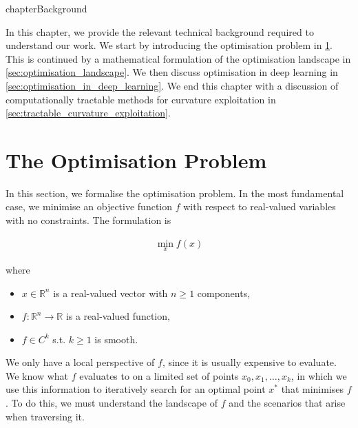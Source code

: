 chapter{Background}

\label{chap:background}



In this chapter, we provide the relevant technical background required to understand our work. We start by introducing the optimisation problem in \cref{sec:optimisation_problem}. This is continued by a mathematical formulation of the optimisation landscape in \cref{sec:optimisation_landscape}. We then discuss optimisation in deep learning in \cref{sec:optimisation_in_deep_learning}. We end this chapter with a discussion of computationally tractable methods for curvature exploitation in \cref{sec:tractable_curvature_exploitation}.



\section{The Optimisation Problem}

\label{sec:optimisation_problem}



In this section, we formalise the optimisation problem. In the most fundamental case, we minimise an objective function $f$ with respect to real-valued variables with no constraints. The formulation is 

\begin{align}

    \min_{x} f(x)

\end{align}

where

\begin{itemize}

    \item $x \in \mathbb{R}^n$ is a real-valued vector with $n \geq 1$ components,

    \item $f: \mathbb{R}^n \to \mathbb{R}$ is a real-valued function,

    \item $f \in C^k$ s.t. $k \geq 1$ is smooth.

\end{itemize}

We only have a local perspective of $f$, since it is usually expensive to evaluate. We know what $f$ evaluates to on a limited set of points $x_0, x_1, \ldots, x_k$, in which we use this information to iteratively search for an optimal point $x^*$ that minimises $f$. To do this, we must understand the landscape of $f$ and the scenarios that arise when traversing it.



